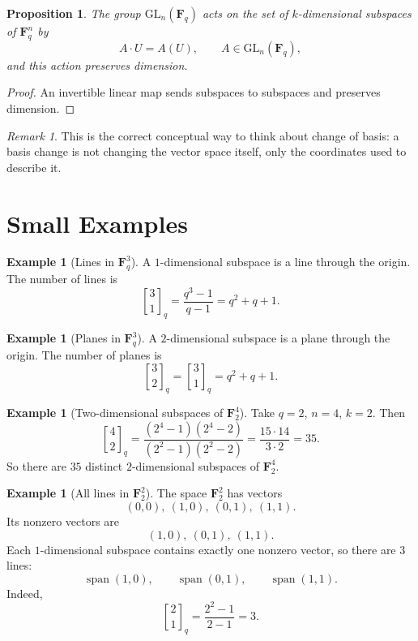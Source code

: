 \documentclass[11pt]{article}
\newtheorem{proposition}[theorem]{Proposition}
\theoremstyle{definition}
\newtheorem{example}[theorem]{Example}
\theoremstyle{remark}
\newtheorem{remark}[theorem]{Remark}
\newcommand{\F}{\mathbf{F}}
\newcommand{\GL}{\mathrm{GL}}
\newcommand{\Span}{\operatorname{span}}
\newcommand{\qbinom}[2]{\genfrac{[}{]}{0pt}{}{#1}{#2}_q}
\begin{document}
	\begin{proposition}
		The group \(\GL_n(\F_q)\) acts on the set of \(k\)-dimensional subspaces of \(\F_q^n\) by
		\[
		A\cdot U = A(U),
		\qquad A\in \GL_n(\F_q),
		\]
		and this action preserves dimension.
	\end{proposition}
	
	\begin{proof}
		An invertible linear map sends subspaces to subspaces and preserves dimension.
	\end{proof}
	
	\begin{remark}
		This is the correct conceptual way to think about change of basis: a basis change is not changing the vector space itself, only the coordinates used to describe it.
	\end{remark}
	
	\section{Small Examples}
	
	\begin{example}[Lines in \(\F_q^3\)]
		A \(1\)-dimensional subspace is a line through the origin. The number of lines is
		\[
		\qbinom{3}{1}=\frac{q^3-1}{q-1}=q^2+q+1.
		\]
	\end{example}
	
	\begin{example}[Planes in \(\F_q^3\)]
		A \(2\)-dimensional subspace is a plane through the origin. The number of planes is
		\[
		\qbinom{3}{2}=\qbinom{3}{1}=q^2+q+1.
		\]
	\end{example}
	
	\begin{example}[Two-dimensional subspaces of \(\F_2^4\)]
		Take \(q=2\), \(n=4\), \(k=2\). Then
		\[
		\qbinom{4}{2}
		=
		\frac{(2^4-1)(2^4-2)}{(2^2-1)(2^2-2)}
		=
		\frac{15\cdot 14}{3\cdot 2}
		=
		35.
		\]
		So there are \(35\) distinct \(2\)-dimensional subspaces of \(\F_2^4\).
	\end{example}
	
	\begin{example}[All lines in \(\F_2^2\)]
		The space \(\F_2^2\) has vectors
		\[
		(0,0),\ (1,0),\ (0,1),\ (1,1).
		\]
		Its nonzero vectors are
		\[
		(1,0),\ (0,1),\ (1,1).
		\]
		Each \(1\)-dimensional subspace contains exactly one nonzero vector, so there are \(3\) lines:
		\[
		\Span(1,0),\qquad \Span(0,1),\qquad \Span(1,1).
		\]
		Indeed,
		\[
		\qbinom{2}{1}=\frac{2^2-1}{2-1}=3.
		\]
	\end{example}
	
\end{document}
